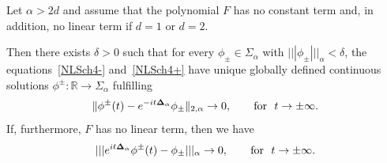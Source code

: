 \begin{theorem}\label{th3}
Let $\alpha>2d$ and assume that the polynomial $F$ has no constant
term and, in addition, no linear term
if $d=1$ or $d=2$.

Then there exists $\delta>0$ such that for every
 $\phi_\pm\in\Sigma_{\alpha}$ with $|||\phi_\pm|||_{\alpha}<\delta$, the
equations~\eqref{NLSch4-} and~\eqref{NLSch4+} have unique globally
defined continuous solutions $\phi^\pm:\mathbb R\to \Sigma_{\alpha}$ fulfilling
\begin{gather}\label{solsmall1}
\Vert\phi^\pm(t)- e^{-it{{\bf\Delta}_\alpha}}\phi_\pm\Vert_{2,\alpha}  \to
0,\qquad\mbox{for}\ \ t\to\pm\infty .
\end{gather}
If, furthermore, $F$ has no linear term, then we have
\begin{gather}\label{solsmall2}
 |||e^{it{{\bf\Delta}_\alpha}}\phi^\pm(t)- \phi_\pm |||_{\alpha}  \to
0,\qquad\mbox{for}\  \ t\to\pm\infty .
\end{gather}
\end{theorem}
